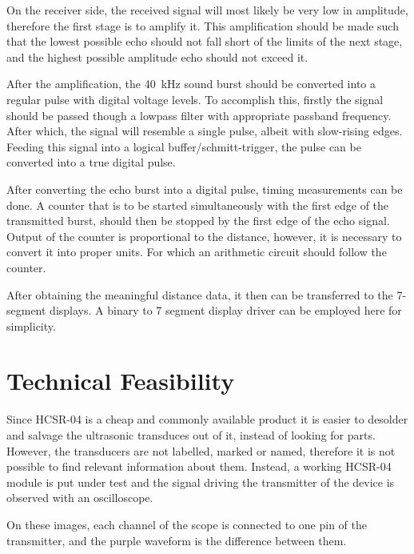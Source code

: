 \documentclass[12pt, a4paper]{article}
\begin{document}
    \pagebreak
    On the receiver side, the received signal will most likely be very low in amplitude, therefore the first stage is to amplify it. This amplification should be made such that the lowest possible echo should not fall short of the limits of the next stage, and the highest possible amplitude echo should not exceed it.
    
    \bigskip
    After the amplification, the \SI{40}{\kilo\hertz} sound burst should be converted into a regular pulse with digital voltage levels. To accomplish this, firstly the signal should be passed though a lowpass filter with appropriate passband frequency. After which, the signal will resemble a single pulse, albeit with slow-rising edges. Feeding this signal into a logical buffer/schmitt-trigger, the pulse can be converted into a true digital pulse. 

    \bigskip
    After converting the echo burst into a digital pulse, timing measurements can be done. A counter that is to be started simultaneously with the first edge of the transmitted burst, should then be stopped by the first edge of the echo signal. Output of the counter is proportional to the distance, however, it is necessary to convert it into proper units. For which an arithmetic circuit should follow the counter.

    \bigskip
    After obtaining the meaningful distance data, it then can be transferred to the 7-segment displays. A binary to 7 segment display driver can be employed here for simplicity.


    \pagebreak

    \section{Technical Feasibility}

        Since HCSR-04 is a cheap and commonly available product it is easier to desolder and salvage the ultrasonic transduces out of it, instead of looking for parts. However, the transducers are not labelled, marked or named, therefore it is not possible to find relevant information about them. Instead, a working HCSR-04 module is put under test and the signal driving the transmitter of the device is observed with an oscilloscope. 

        \noindent On these images, each channel of the scope is connected to one pin of the transmitter, and the purple waveform is the difference between them.

        \bigskip
\end{document}
